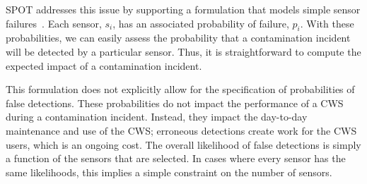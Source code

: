 SPOT addresses this issue by supporting a formulation that models simple sensor   failures~\cite{BerCarHarLeuPhiWat06}. Each sensor, $s_i$, has an associated probability of failure, $p_i$. With these probabilities, we can easily assess the probability that a contamination incident will be detected by a particular sensor. Thus, it is straightforward to compute the expected impact of a contamination incident.

This formulation does not explicitly allow for the specification of probabilities of false detections. These probabilities do not impact the performance of a CWS during a contamination incident. Instead, they impact the day-\/to-\/day maintenance and use of the CWS; erroneous detections create work for the CWS users, which is an ongoing cost. The overall likelihood of false detections is simply a function of the sensors that are selected. In cases where every sensor has the same likelihoods, this implies a simple constraint on the number of sensors. 

